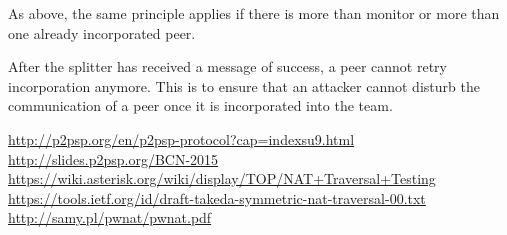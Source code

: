 \documentclass{article}
\begin{document}
As above, the same principle applies if there is more than monitor or
more than one already incorporated peer.

After the splitter has received a message of success, a peer cannot
retry incorporation anymore. This is to ensure that an attacker cannot
disturb the communication of a peer once it is incorporated into the
team.

\begin{thebibliography}{9}

 \url{http://p2psp.org/en/p2psp-protocol?cap=indexsu9.html}
 \url{http://slides.p2psp.org/BCN-2015}
 \url{https://wiki.asterisk.org/wiki/display/TOP/NAT+Traversal+Testing}
 \url{https://tools.ietf.org/id/draft-takeda-symmetric-nat-traversal-00.txt}
 \url{http://samy.pl/pwnat/pwnat.pdf}

\end{thebibliography}

\end{document}
